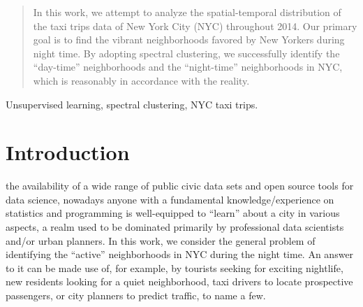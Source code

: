 \documentclass[journal]{IEEEtran}
\begin{document}







\maketitle

\begin{abstract}
  In this work, we attempt to analyze the spatial-temporal distribution of the
  taxi trips data of New York City (NYC) throughout 2014. Our primary goal is to
  find the vibrant neighborhoods favored by New Yorkers during night time. By
  adopting spectral clustering, we successfully identify the ``day-time''
  neighborhoods and the ``night-time'' neighborhoods in NYC, which is reasonably
  in accordance with the reality.
\end{abstract}

\begin{IEEEkeywords}
  Unsupervised learning, spectral clustering, NYC taxi trips.
\end{IEEEkeywords}
%
\IEEEpeerreviewmaketitle

\section{Introduction}
\label{sec:intro}
 the availability of a wide range of public civic data
sets and open source tools for data science, nowadays anyone with a fundamental
knowledge/experience on statistics and programming is well-equipped to
``learn'' about a city in various aspects, a realm used to be dominated primarily by
professional data scientists and/or urban planners. In this work, we consider
the general problem of identifying the ``active'' neighborhoods in NYC during
the night time. An answer to it can be made use of, for example, by
tourists seeking for exciting nightlife, new residents looking for a quiet
neighborhood, taxi drivers to locate prospective passengers, or city
planners to predict traffic, to name a few.
\end{document}
